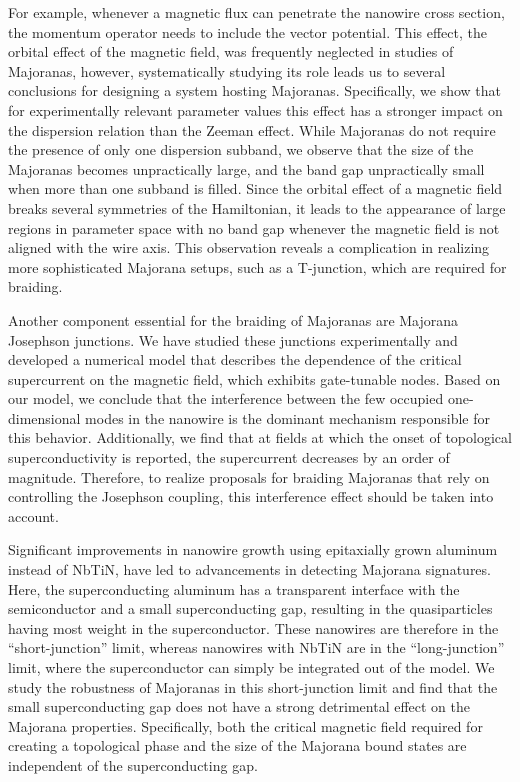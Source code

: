 For example, whenever a magnetic flux can penetrate the nanowire cross section, the momentum operator needs to include the vector potential.
This effect, the orbital effect of the magnetic field, was frequently neglected in studies of Majoranas, however, systematically studying its role leads us to several conclusions for designing a system hosting Majoranas.
Specifically, we show that for experimentally relevant parameter values this effect has a stronger impact on the dispersion relation than the Zeeman effect.
While Majoranas do not require the presence of only one dispersion subband, we observe that the size of the Majoranas becomes unpractically large, and the band gap unpractically small when more than one subband is filled.
Since the orbital effect of a magnetic field breaks several symmetries of the Hamiltonian, it leads to the appearance of large regions in parameter space with no band gap whenever the magnetic field is not aligned with the wire axis.
This observation reveals a complication in realizing more sophisticated Majorana setups, such as a T-junction, which are required for braiding.

Another component essential for the braiding of Majoranas are Majorana Josephson junctions.
We have studied these junctions experimentally and developed a numerical model that describes the dependence of the critical supercurrent on the magnetic field, which exhibits gate-tunable nodes.
Based on our model, we conclude that the interference between the few occupied one-dimensional modes in the nanowire is the dominant mechanism responsible for this behavior.
Additionally, we find that at fields at which the onset of topological superconductivity is reported, the supercurrent decreases by an order of magnitude.
Therefore, to realize proposals for braiding Majoranas that rely on controlling the Josephson coupling, this interference effect should be taken into account.

Significant improvements in nanowire growth using epitaxially grown aluminum instead of NbTiN, have led to advancements in detecting Majorana signatures.
Here, the superconducting aluminum has a transparent interface with the semiconductor and a small superconducting gap, resulting in the quasiparticles having most weight in the superconductor.
These nanowires are therefore in the ``short-junction'' limit, whereas nanowires with NbTiN are in the ``long-junction'' limit, where the superconductor can simply be integrated out of the model.
We study the robustness of Majoranas in this short-junction limit and find that the small superconducting gap does not have a strong detrimental effect on the Majorana properties.
Specifically, both the critical magnetic field required for creating a topological phase and the size of the Majorana bound states are independent of the superconducting gap.

